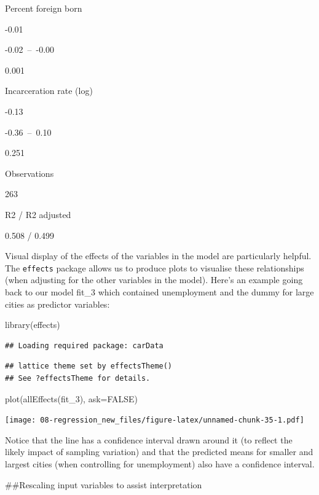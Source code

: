 \documentclass[
]{book}
\newenvironment{Shaded}{\begin{snugshade}}{\end{snugshade}}
\newcommand{\AttributeTok}[1]{\textcolor[rgb]{0.77,0.63,0.00}{#1}}
\newcommand{\ConstantTok}[1]{\textcolor[rgb]{0.00,0.00,0.00}{#1}}
\newcommand{\FunctionTok}[1]{\textcolor[rgb]{0.00,0.00,0.00}{#1}}
\newcommand{\NormalTok}[1]{#1}
\begin{document}
Percent foreign born

-0.01

-0.02~--~-0.00

0.001

Incarceration rate (log)

-0.13

-0.36~--~0.10

0.251

Observations

263

R2 / R2 adjusted

0.508 / 0.499

Visual display of the effects of the variables in the model are particularly helpful. The \texttt{effects} package allows us to produce plots to visualise these relationships (when adjusting for the other variables in the model). Here's an example going back to our model fit\_3 which contained unemployment and the dummy for large cities as predictor variables:

\begin{Shaded}
\begin{Highlighting}[]
\FunctionTok{library}\NormalTok{(effects)}
\end{Highlighting}
\end{Shaded}

\begin{verbatim}
## Loading required package: carData
\end{verbatim}

\begin{verbatim}
## lattice theme set by effectsTheme()
## See ?effectsTheme for details.
\end{verbatim}

\begin{Shaded}
\begin{Highlighting}[]
\FunctionTok{plot}\NormalTok{(}\FunctionTok{allEffects}\NormalTok{(fit\_3), }\AttributeTok{ask=}\ConstantTok{FALSE}\NormalTok{)}
\end{Highlighting}
\end{Shaded}

\texttt{[image: 08-regression\_new\_files/figure-latex/unnamed-chunk-35-1.pdf]}

Notice that the line has a confidence interval drawn around it (to reflect the likely impact of sampling variation) and that the predicted means for smaller and largest cities (when controlling for unemployment) also have a confidence interval.

\#\#Rescaling input variables to assist interpretation
\end{document}
